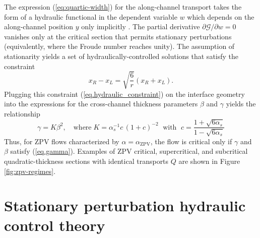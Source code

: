 \documentclass{jfm}
\begin{document}
The expression (\ref{eq:quartic-width}) for the along-channel transport takes the form of a hydraulic functional in the dependent variable $w$ which depends on the along-channel position $y$ only implicitly \citep{gill_hydraulics_1977}. The partial derivative $\partial \mathcal{G}/\partial w = 0$ vanishes only at the critical section that permits stationary perturbations (equivalently, where the Froude number reaches unity). The assumption of stationarity yields a set of hydraulically-controlled solutions that satisfy the constraint
\begin{equation}\label{eq.hydraulic_constraint}
x_{R}-x_{L} = \sqrt{\frac{6}{r}}\left( x_{R} + x_{L} \right).
\end{equation}
Plugging this constraint (\ref{eq.hydraulic_constraint}) on the interface geometry into the expressions for the cross-channel thickness parameters $\beta$ and $\gamma$ yields the relationship
\begin{equation}\label{eq.gamma}
\gamma = K \beta^{2},\quad\text{where}\; K = \alpha_{s}^{-1} c\,(1 + c)^{-2} \;\text{ with }\;c = \frac{1+\sqrt{6\alpha_{s}}}{1-\sqrt{6\alpha_{s}}}
\end{equation}
Thus, for ZPV flows characterized by $\alpha = \alpha_{\text{ZPV}}$, the flow is critical only if $\gamma$ and $\beta$ satisfy (\ref{eq.gamma}). Examples of ZPV critical, supercritical, and subcritical quadratic-thickness sections with identical transports $Q$ are shown in Figure \ref{fig:zpv-regimes}.


\section{Stationary perturbation hydraulic control theory}
\end{document}
